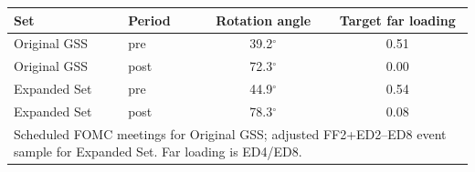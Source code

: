 \begin{tabular}{llcc}
\toprule
Set & Period & Rotation angle & Target far loading \\
\midrule
Original GSS & pre & 39.2$^\circ$ & 0.51 \\
Original GSS & post & 72.3$^\circ$ & 0.00 \\
\midrule
Expanded Set & pre & 44.9$^\circ$ & 0.54 \\
Expanded Set & post & 78.3$^\circ$ & 0.08 \\
\midrule
\multicolumn{4}{p{0.62\linewidth}}{\footnotesize Scheduled FOMC meetings for Original GSS; adjusted FF2+ED2--ED8 event sample for Expanded Set. Far loading is ED4/ED8.}\\
\bottomrule
\end{tabular}
